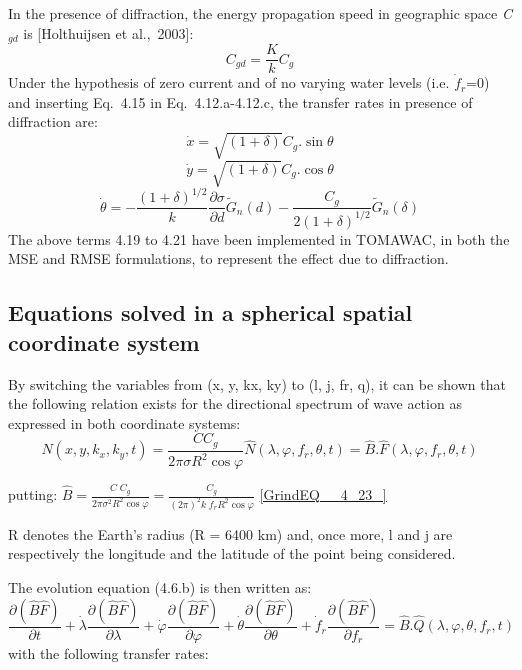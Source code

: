  In the presence of diffraction, the energy propagation speed in geographic space \textit{C${}_{gd}$} is [Holthuijsen et al.,~2003]:
\begin{equation} \label{GrindEQ__4_18_}
C_{gd} =\frac{K}{k} C_{g}
\end{equation}
Under the hypothesis of zero current and of no varying water levels (i.e. $\dot{f}_{r} $=0) and inserting Eq.~4.15 in Eq.~4.12.a-4.12.c, the transfer rates in presence of diffraction are:
\begin{equation} \label{GrindEQ__4_19_}
\dot{x}=\sqrt{(1+\delta )} C_{g} .\sin \theta
\end{equation}
\begin{equation} \label{GrindEQ__4_20_}
\dot{y}=\sqrt{(1+\delta )} C_{g} .\cos \theta
\end{equation}
\begin{equation} \label{GrindEQ__4_21_}
\dot{\theta }=-\frac{(1+\delta )^{1/2} }{k} \frac{\partial \sigma }{\partial d} \tilde{G}_{n} (d)-\frac{C_{g} }{2(1+\delta )^{1/2} } \tilde{G}_{n} (\delta )
\end{equation}
The above terms 4.19 to 4.21 have been implemented in TOMAWAC, in both the MSE and RMSE formulations, to represent the effect due to diffraction.




\subsection{ Equations solved in a spherical spatial coordinate system}

 By switching the variables from (x, y, kx, ky) to (l, j, fr, q), it can be shown that the following relation exists for the directional spectrum of wave action as expressed in both coordinate systems:
\begin{equation} \label{GrindEQ__4_22_}
N(x,y,k_{x} ,k_{y} ,t)=\frac{CC_{g} }{2\pi \sigma R^{2} \cos \varphi } \hat{N}(\lambda ,\varphi ,f_{r} ,\theta ,t)=\hat{B}.\hat{F}(\lambda ,\varphi ,f_{r} ,\theta ,t)
\end{equation}

putting: $\hat{B}=\frac{C\; C_{g} }{2\pi \sigma ^{2} R^{2} \cos \varphi } =\frac{C_{g} }{\left(2\pi \right)^{2} k\; f_{r} R^{2} \cos \varphi } $ \eqref{GrindEQ__4_23_}

 R denotes the Earth's radius (R = 6400 km) and, once more, l and j are respectively the longitude and the latitude of the point being considered.

 The evolution equation (4.6.b) is then written as:
\begin{equation} \label{GrindEQ__4_24_}
\frac{\partial (\hat{B}\hat{F})}{\partial t} +\dot{\lambda }\frac{\partial (\hat{B}\hat{F})}{\partial \lambda } +\dot{\varphi }\frac{\partial (\hat{B}\hat{F})}{\partial \varphi } +\dot{\theta }\frac{\partial (\hat{B}\hat{F})}{\partial \theta } +\dot{f}_{r} \frac{\partial (\hat{B}\hat{F})}{\partial f_{r} } =\hat{B}.\hat{Q}(\lambda ,\varphi ,\theta ,f_{r} ,t)
\end{equation}
with the following transfer rates:

